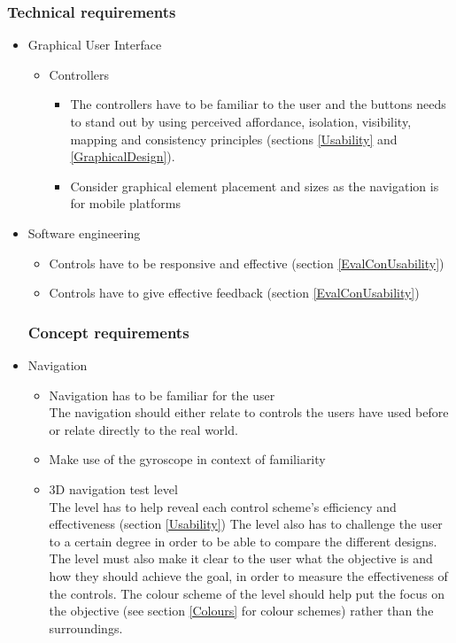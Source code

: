 \subsubsection{Technical requirements}
\begin{itemize}
	\item Graphical User Interface
		\begin{itemize}
		\item Controllers
			\begin{itemize}
				\item The controllers have to be familiar to the user and the buttons needs to stand out by using perceived affordance, isolation, visibility, mapping and consistency principles (sections \ref{Usability} and \ref{GraphicalDesign}).  
				\item Consider graphical element placement and sizes as the navigation is for mobile platforms
			\end{itemize}
		\end{itemize}
	\item Software engineering
		\begin{itemize}
			\item Controls have to be responsive and effective (section \ref{EvalConUsability})
			\item Controls have to give effective feedback (section \ref{EvalConUsability})
		\end{itemize}	
\subsubsection{Concept requirements}
	\item Navigation
		\begin{itemize}
		 	\item Navigation has to be familiar for the user \\
The navigation should either relate to controls the users have used before or relate directly to the real world.	
		 	\item Make use of the gyroscope in context of familiarity
		 	\item 3D navigation test level\\
The level has to help reveal each control scheme's efficiency and effectiveness (section \ref{Usability})
The level also has to challenge the user to a certain 	degree in order to be able to compare the different designs. The level must also make it clear to the user what the objective is and how they should achieve the goal, in order to measure the effectiveness of the controls. The colour scheme of the level should help put the focus on the objective (see section \ref{Colours} for colour schemes) rather than the surroundings.
				\end{itemize}
\end{itemize}